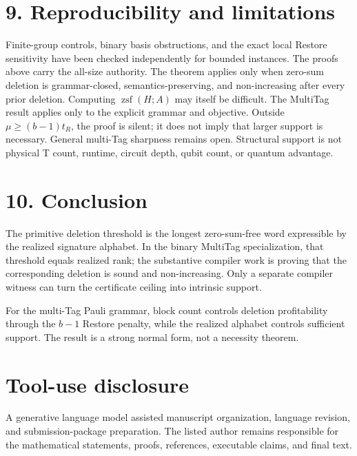 \documentclass[
  11pt,
]{article}
\begin{document}
\hypertarget{reproducibility-and-limitations}{%
\section{9. Reproducibility and
limitations}\label{reproducibility-and-limitations}}

Finite-group controls, binary basis obstructions, and the exact local
Restore sensitivity have been checked independently for bounded
instances. The proofs above carry the all-size authority. The theorem
applies only when zero-sum deletion is grammar-closed,
semantics-preserving, and non-increasing after every prior deletion.
Computing \(\operatorname{zsf}(H; A)\) may itself be difficult. The
MultiTag result applies only to the explicit grammar and objective.
Outside \(\mu\ge(b-1)t_R\), the proof is silent; it does not imply that
larger support is necessary. General multi-Tag sharpness remains open.
Structural support is not physical T count, runtime, circuit depth,
qubit count, or quantum advantage.

\hypertarget{conclusion}{%
\section{10. Conclusion}\label{conclusion}}

The primitive deletion threshold is the longest zero-sum-free word
expressible by the realized signature alphabet. In the binary MultiTag
specialization, that threshold equals realized rank; the substantive
compiler work is proving that the corresponding deletion is sound and
non-increasing. Only a separate compiler witness can turn the
certificate ceiling into intrinsic support.

For the multi-Tag Pauli grammar, block count controls deletion
profitability through the \(b-1\) Restore penalty, while the realized
alphabet controls sufficient support. The result is a strong normal
form, not a necessity theorem.

\hypertarget{tool-use-disclosure}{%
\section{Tool-use disclosure}\label{tool-use-disclosure}}

A generative language model assisted manuscript organization, language
revision, and submission-package preparation. The listed author remains
responsible for the mathematical statements, proofs, references,
executable claims, and final text.
\end{document}
